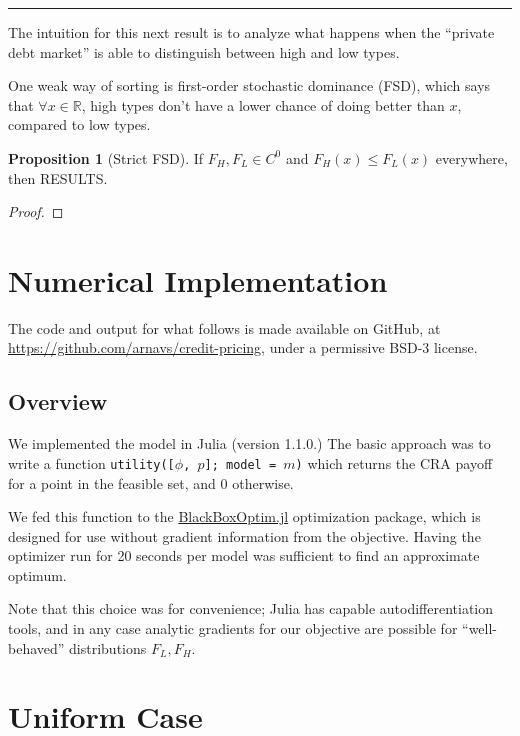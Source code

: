 \documentclass{article}
\theoremstyle{definition}
\newtheorem{proposition}{Proposition}
\begin{document}
\hrule \hspace{5 em} 

The intuition for this next result is to analyze what happens when the ``private debt market'' is able to distinguish between high and low types.

One weak way of sorting is first-order stochastic dominance (FSD), which says that $\forall x \in \mathbb{R}$, high types don't have a lower chance of doing better than $x$, compared to low types.

\begin{proposition}[Strict FSD] If $F_H, F_L \in C^0$ and $F_H(x) \leq F_L(x)$ everywhere, then RESULTS.
\end{proposition}

\begin{proof}
\end{proof} 

\newpage

\section{Numerical Implementation}

The code and output for what follows is made available on GitHub, at \url{https://github.com/arnavs/credit-pricing}, under a permissive BSD-3 license.

\subsection{Overview}

We implemented the model in Julia (version 1.1.0.) The basic approach was to write a function \texttt{utility([$\phi$, $p$]; model = $m$)} which returns the CRA payoff for a point in the feasible set, and 0 otherwise.

We fed this function to the \href{https://github.com/robertfeldt/BlackBoxOptim.jl}{\color{blue} BlackBoxOptim.jl} optimization package, which is designed for use without gradient information from the objective. Having the optimizer run for 20 seconds per model was sufficient to find an approximate optimum. 

Note that this choice was for convenience; Julia has capable autodifferentiation tools, and in any case analytic gradients for our objective are possible for ``well-behaved'' distributions $F_L, F_H$.

\newpage 

\section{Uniform Case}
\end{document}
